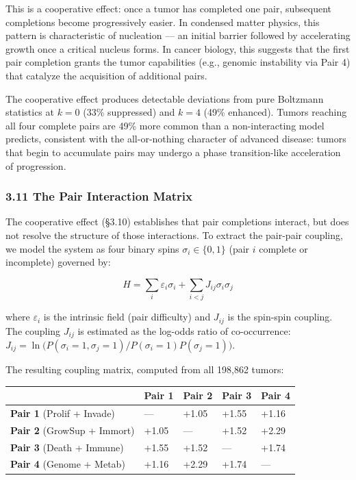 \documentclass[
  11pt,
]{article}
\newcounter{none} %
\begin{document}
This is a cooperative effect: once a tumor has completed one pair,
subsequent completions become progressively easier. In condensed matter
physics, this pattern is characteristic of nucleation --- an initial
barrier followed by accelerating growth once a critical nucleus forms.
In cancer biology, this suggests that the first pair completion grants
the tumor capabilities (e.g., genomic instability via Pair 4) that
catalyze the acquisition of additional pairs.

The cooperative effect produces detectable deviations from pure
Boltzmann statistics at \(k = 0\) (33\% suppressed) and \(k = 4\) (49\%
enhanced). Tumors reaching all four complete pairs are 49\% more common
than a non-interacting model predicts, consistent with the
all-or-nothing character of advanced disease: tumors that begin to
accumulate pairs may undergo a phase transition-like acceleration of
progression.

\subsubsection{3.11 The Pair Interaction
Matrix}\label{the-pair-interaction-matrix}

The cooperative effect (§3.10) establishes that pair completions
interact, but does not resolve the structure of those interactions. To
extract the pair-pair coupling, we model the system as four binary spins
\(\sigma_i \in \{0,1\}\) (pair \(i\) complete or incomplete) governed
by:

\[H = \sum_i \varepsilon_i \sigma_i + \sum_{i<j} J_{ij} \sigma_i \sigma_j \tag{5}\]

where \(\varepsilon_i\) is the intrinsic field (pair difficulty) and
\(J_{ij}\) is the spin-spin coupling. The coupling \(J_{ij}\) is
estimated as the log-odds ratio of co-occurrence:
\(J_{ij} = \ln\bigl(P(\sigma_i{=}1, \sigma_j{=}1) / P(\sigma_i{=}1) P(\sigma_j{=}1)\bigr)\).

The resulting coupling matrix, computed from all 198,862 tumors:

{\def\LTcaptype{none} %
\begin{longtable}[]{@{}lllll@{}}
\toprule\noalign{}
& Pair 1 & Pair 2 & Pair 3 & Pair 4 \\
\midrule\noalign{}
\endhead
\bottomrule\noalign{}
\endlastfoot
\textbf{Pair 1} (Prolif + Invade) & --- & +1.05 & +1.55 & +1.16 \\
\textbf{Pair 2} (GrowSup + Immort) & +1.05 & --- & +1.52 & +2.29 \\
\textbf{Pair 3} (Death + Immune) & +1.55 & +1.52 & --- & +1.74 \\
\textbf{Pair 4} (Genome + Metab) & +1.16 & +2.29 & +1.74 & --- \\
\end{longtable}
}
\end{document}

